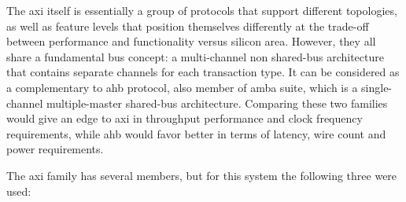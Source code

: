 \label{amba}
The \gls{axi} itself is essentially a group of protocols that support different topologies,
as well as feature levels that position themselves differently at the trade-off
between performance and functionality versus silicon area.
However, they all share a fundamental bus concept:
a multi-channel non shared-bus architecture that contains separate
channels for each \gls{transaction} type. It can be considered as a complementary
to \gls{ahb} protocol, also member of \gls{amba} suite,
which is a single-channel multiple-master shared-bus architecture.
Comparing these two families would give an edge to \gls{axi} in
throughput performance and clock frequency requirements, while \gls{ahb} would favor
better in terms of latency, wire count and power requirements.

The \gls{axi} family has several members, but for this system the following three were used:
